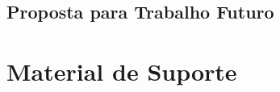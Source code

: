\documentclass[a4paper]{report}
\begin{document}
	\section{Proposta para Trabalho Futuro}
	

	

	
	
	
	\chapter{Material de Suporte}






\end{document}

